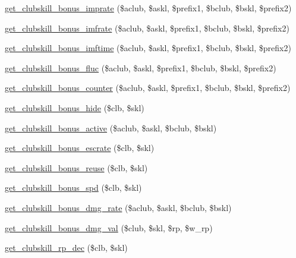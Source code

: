 \begin{DoxyCompactItemize}
\item 
\hyperlink{clubskills_8func_8php_a33a3c011acd237cb0b66c2a5173de274}{get\+\_\+clubskill\+\_\+bonus\+\_\+imprate} (\$aclub, \$askl, \$prefix1, \$bclub, \$bskl, \$prefix2)
\item 
\hyperlink{clubskills_8func_8php_a8e72c54efc620445ea3e4b27d2f1ee82}{get\+\_\+clubskill\+\_\+bonus\+\_\+imfrate} (\$aclub, \$askl, \$prefix1, \$bclub, \$bskl, \$prefix2)
\item 
\hyperlink{clubskills_8func_8php_ab89040eadae129815cdf51bc71ce1ccd}{get\+\_\+clubskill\+\_\+bonus\+\_\+imftime} (\$aclub, \$askl, \$prefix1, \$bclub, \$bskl, \$prefix2)
\item 
\hyperlink{clubskills_8func_8php_af47509df9b34679b4c7a208aca3db7d8}{get\+\_\+clubskill\+\_\+bonus\+\_\+fluc} (\$aclub, \$askl, \$prefix1, \$bclub, \$bskl, \$prefix2)
\item 
\hyperlink{clubskills_8func_8php_a68c08f01b58e32451f25d17a76193e37}{get\+\_\+clubskill\+\_\+bonus\+\_\+counter} (\$aclub, \$askl, \$prefix1, \$bclub, \$bskl, \$prefix2)
\item 
\hyperlink{clubskills_8func_8php_abd6b2c743df0559ee5a7d9953d9d4fec}{get\+\_\+clubskill\+\_\+bonus\+\_\+hide} (\$clb, \$skl)
\item 
\hyperlink{clubskills_8func_8php_a1f78342d7f7c0cd69073e0262b71e109}{get\+\_\+clubskill\+\_\+bonus\+\_\+active} (\$aclub, \$askl, \$bclub, \$bskl)
\item 
\hyperlink{clubskills_8func_8php_ac953bbaf41b71a8bbfb21eaeae39986a}{get\+\_\+clubskill\+\_\+bonus\+\_\+escrate} (\$clb, \$skl)
\item 
\hyperlink{clubskills_8func_8php_a750f574b0aedeb2d39715fbdab5a3761}{get\+\_\+clubskill\+\_\+bonus\+\_\+reuse} (\$clb, \$skl)
\item 
\hyperlink{clubskills_8func_8php_a0f0ecd9fbeb537aae66484dd6e23939f}{get\+\_\+clubskill\+\_\+bonus\+\_\+spd} (\$clb, \$skl)
\item 
\hyperlink{clubskills_8func_8php_abd8e6de2b485ef460ffe5d8c4f3a75f6}{get\+\_\+clubskill\+\_\+bonus\+\_\+dmg\+\_\+rate} (\$aclub, \$askl, \$bclub, \$bskl)
\item 
\hyperlink{clubskills_8func_8php_abfc71371560169532d805e104a0b8a46}{get\+\_\+clubskill\+\_\+bonus\+\_\+dmg\+\_\+val} (\$club, \$skl, \$rp, \$w\+\_\+rp)
\item 
\hyperlink{clubskills_8func_8php_af956bd2d0bd5011bd73c78da3e6f908d}{get\+\_\+clubskill\+\_\+rp\+\_\+dec} (\$clb, \$skl)
\end{DoxyCompactItemize}


